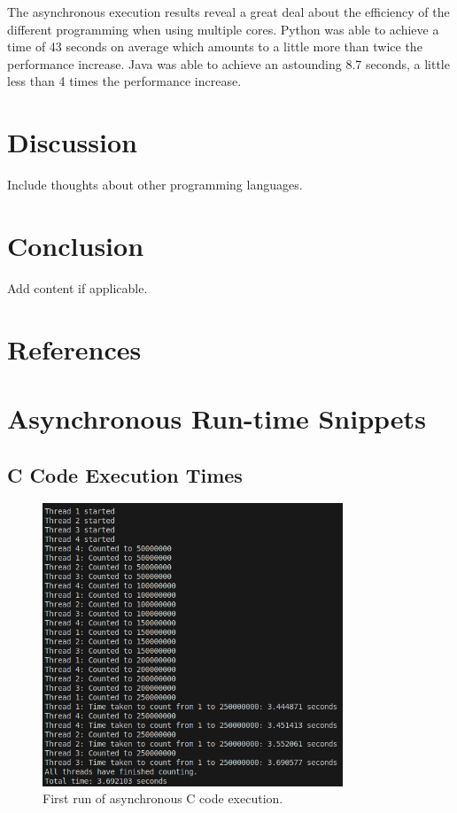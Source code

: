 \documentclass[12pt,a4paper]{article}
\begin{document}
The asynchronous execution results reveal a great deal about the efficiency of the different programming when using multiple cores. Python was able to achieve a time of 43 seconds on average which amounts to a little more than twice the performance increase. Java was able to achieve an astounding 8.7 seconds, a little less than 4 times the performance increase.

\newpage
\section{Discussion}

Include thoughts about other programming languages.

\newpage
\section{Conclusion}

Add content if applicable.

\newpage
\section{References}
\printbibliography

\clearpage
\appendix

\section{Asynchronous Run-time Snippets}

\subsection{C Code Execution Times} 

\begin{figure}[htbp]
    \centering
    \includegraphics[width=0.8\textwidth]{../async_records/results_c/result_1.png}
    \caption{First run of asynchronous C code execution.}
    \label{fig:C-async-runtime-1}
\end{figure}
\end{document}
